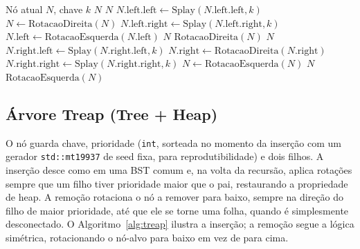\documentclass[conference]{IEEEtran}
\begin{document}
\begin{algorithm}[H]
\caption{Algoritmo de Reorganização Splay (Sleator-Tarjan)}
\label{alg:splay}
\begin{algorithmic}[1]
\REQUIRE Nó atual $N$, chave $k$
    \RETURN $N$
\ENDIF
{}
        \RETURN $N$
    \ENDIF
        \STATE {}
        \STATE $N.\text{left}.\text{left}
        \gets \text{Splay}(N.\text{left}.\text{left}, k)$
        \STATE $N \gets \text{RotacaoDireita}(N)$
        \STATE {}
        \STATE $N.\text{left}.\text{right}
        \gets \text{Splay}(N.\text{left}.\text{right}, k)$
            \STATE $N.\text{left}
            \gets \text{RotacaoEsquerda}(N.\text{left})$
        \ENDIF
    \ENDIF
        \RETURN $N$
    \ELSE
        \RETURN $\text{RotacaoDireita}(N)$
    \ENDIF
\ELSE
        \RETURN $N$
    \ENDIF
        \STATE {}
        \STATE $N.\text{right}.\text{left}
        \gets \text{Splay}(N.\text{right}.\text{left}, k)$
            \STATE $N.\text{right}
            \gets \text{RotacaoDireita}(N.\text{right})$
        \ENDIF
        \STATE {}
        \STATE $N.\text{right}.\text{right}
        \gets \text{Splay}(N.\text{right}.\text{right}, k)$
        \STATE $N \gets \text{RotacaoEsquerda}(N)$
    \ENDIF
        \RETURN $N$
    \ELSE
        \RETURN $\text{RotacaoEsquerda}(N)$
    \ENDIF
\ENDIF
\end{algorithmic}
\end{algorithm}

\subsection{Árvore Treap (Tree + Heap)}
O nó guarda chave, prioridade (\texttt{int}, sorteada no momento da inserção com um gerador \texttt{std::mt19937} de seed fixa, para reprodutibilidade) e dois filhos. A inserção desce como em uma BST comum e, na volta da recursão, aplica rotações sempre que um filho tiver prioridade maior que o pai, restaurando a propriedade de heap. A remoção rotaciona o nó a remover para baixo, sempre na direção do filho de maior prioridade, até que ele se torne uma folha, quando é simplesmente desconectado. O Algoritmo~\ref{alg:treap} ilustra a inserção; a remoção segue a lógica simétrica, rotacionando o nó-alvo para baixo em vez de para cima.
\end{document}
